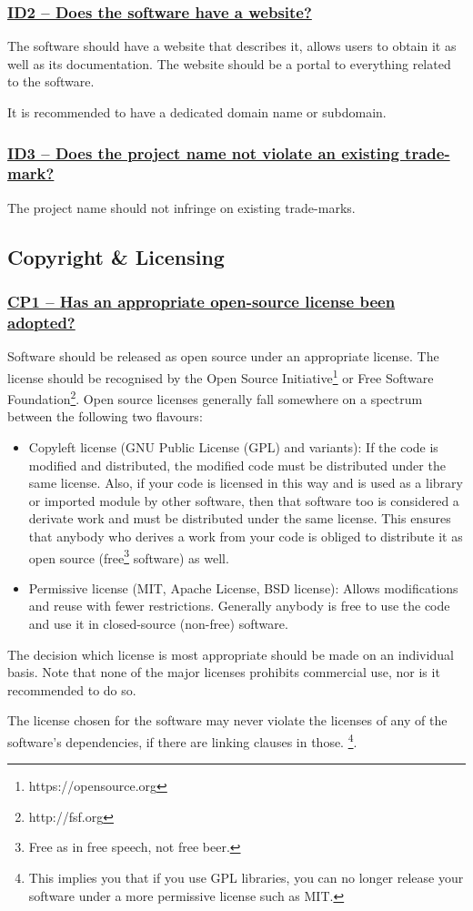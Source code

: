 \documentclass[a4paper,11pt]{article}
\newcommand{\indicator}[1]{\subsubsection*{\underline{#1}}}
\begin{document}
\indicator{ID2 -- Does the software have a website?}

The software should have a website that describes it, allows users to obtain
it as well as its documentation. The website should be a portal to everything
related to the software.

It is recommended to have a dedicated domain name or subdomain.

\indicator{ID3 -- Does the project name not violate an existing trade-mark?}

The project name should not infringe on existing trade-marks.

\subsection{Copyright \& Licensing}

\indicator{CP1 -- Has an appropriate open-source license been adopted?}

Software should be released as open source under an appropriate license. The
license should be recognised by the Open Source Initiative\footnote{https://opensource.org} or Free Software
Foundation\footnote{http://fsf.org}. Open source licenses generally fall somewhere on a spectrum between the following two flavours:

\begin{itemize}
 \item Copyleft license (GNU Public License (GPL) and variants): If the code is modified and distributed, the modified code must be distributed under the same license. Also, if your code is licensed in this way and is used as a library or imported module by other software, then that software too is considered a derivate work and must be distributed under the same license. This ensures that anybody who derives a work from your code is obliged to distribute it as open source (free\footnote{Free as in free speech, not free beer.} software) as well.
 \item Permissive license (MIT, Apache License, BSD license): Allows modifications and reuse with fewer restrictions. Generally anybody is free to use the code and use it in closed-source (non-free) software.
\end{itemize}

The decision which license is most appropriate should be made on an individual
basis. Note that none of the major licenses prohibits commercial use, nor is it
recommended to do so.

The license chosen for the software may never violate the licenses of any of
the software's dependencies, if there are linking clauses in those. \footnote{This implies you that if you use GPL libraries, you can no longer release your software under a more permissive license such as MIT.}.
\end{document}
